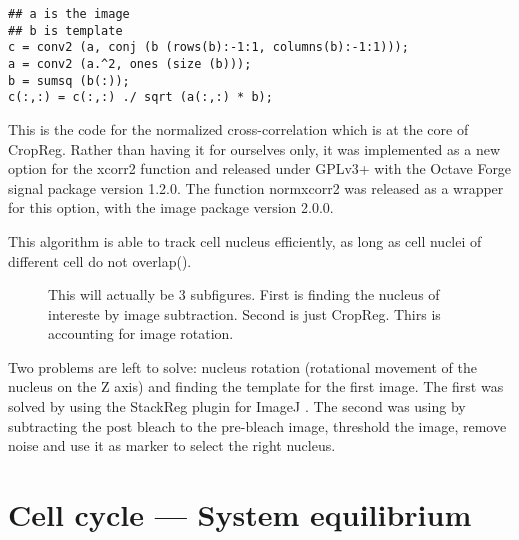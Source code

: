     \begin{verbatim}
## a is the image
## b is template
c = conv2 (a, conj (b (rows(b):-1:1, columns(b):-1:1))); 
a = conv2 (a.^2, ones (size (b)));
b = sumsq (b(:));
c(:,:) = c(:,:) ./ sqrt (a(:,:) * b);
\end{verbatim}
    
    
    This is the code for the normalized cross-correlation which is at the core of CropReg. Rather than having
    it for ourselves only, it was implemented as a new option for the xcorr2 function and released under GPLv3+ with
    the Octave Forge signal package version 1.2.0. The function normxcorr2 was released as a wrapper for
    this option, with the image package version 2.0.0.
    
    This algorithm is able to track cell nucleus efficiently, as long as cell nuclei of different cell do not
    overlap().
    
    \begin{figure}
      \centering
      \missingfigure{}
                   {This will actually be 3 subfigures. First is finding the nucleus of intereste by image subtraction.
                    Second is just CropReg. Thirs is accounting for image rotation.}
      \label{fig:cropreg}
    \end{figure}

    Two problems are left to solve: nucleus rotation (rotational movement of the nucleus on the
    Z axis) and finding the template for the first image. The first
    was solved by using the StackReg plugin for ImageJ
    . The second was using by subtracting the post bleach to the
    pre-bleach image, threshold the image, remove noise and use it as marker to select the right nucleus.

\section{Cell cycle --- System equilibrium}
\label{sec:frap-equilibrium}


